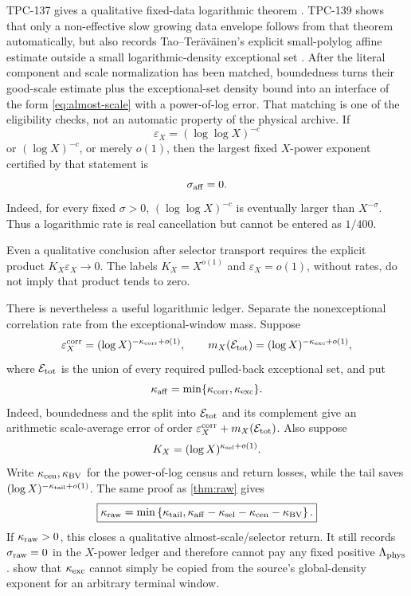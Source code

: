 \documentclass[11pt]{article}
\theoremstyle{definition}
\theoremstyle{remark}
\begin{document}
TPC-137 gives a qualitative fixed-data logarithmic theorem
\citep{WangTPC137}.  TPC-139 shows that only a non-effective slow
growing data envelope follows from that theorem automatically, but
also records Tao--Ter\"av\"ainen's explicit small-polylog affine
estimate outside a small logarithmic-density exceptional set
\citep{WangTPC139,TaoTeravainen2026}.
After the literal component and scale normalization has been
matched, boundedness turns their good-scale estimate plus the
exceptional-set density bound into an interface of the form
\eqref{eq:almost-scale} with a power-of-log error.  That matching is
one of the eligibility checks, not an automatic property of the
physical archive.
If
\[
 \varepsilon_X=(\log\log X)^{-c}
\]
or \((\log X)^{-c}\), or merely \(o(1)\), then the largest fixed
\(X\)-power exponent certified by that statement is
\[
 \sigma_{\rm aff}=0.
\]
Indeed, for every fixed \(\sigma>0\),
\((\log\log X)^{-c}\) is eventually larger than \(X^{-\sigma}\).
Thus a logarithmic rate is real cancellation but cannot be entered
as \(1/400\).

Even a qualitative conclusion after selector transport requires
the explicit product \(K_X\varepsilon_X\to0\).  The labels
\(K_X=X^{o(1)}\) and \(\varepsilon_X=o(1)\), without rates, do not
imply that product tends to zero.

There is nevertheless a useful logarithmic ledger.  Separate the
nonexceptional correlation rate from the exceptional-window mass.
Suppose
\[
 \varepsilon_X^{\rm corr}
 =(\log X)^{-\kappa_{\rm corr}+o(1)},\qquad
 m_X(\mathcal E_{\rm tot})
 =(\log X)^{-\kappa_{\rm exc}+o(1)},
\]
where \(\mathcal E_{\rm tot}\) is the union of every required
pulled-back exceptional set, and put
\begin{equation}
 \kappa_{\rm aff}
 =
 \min\{\kappa_{\rm corr},\kappa_{\rm exc}\}.
\label{eq:effective-log-aff}
\end{equation}
Indeed, boundedness and the split into
\(\mathcal E_{\rm tot}\) and its complement give an arithmetic
scale-average error of order
\(\varepsilon_X^{\rm corr}+m_X(\mathcal E_{\rm tot})\).
Also suppose
\[
 K_X=(\log X)^{\kappa_{\rm sel}+o(1)}.
\]
Write \(\kappa_{\rm cen},\kappa_{\rm BV}\) for the
power-of-log census and return losses, while the tail saves
\((\log X)^{-\kappa_{\rm tail}+o(1)}\).  The same proof as
\cref{thm:raw} gives
\begin{equation}
\boxed{
 \kappa_{\rm raw}
 =
 \min\left\{
 \kappa_{\rm tail},
 \kappa_{\rm aff}-\kappa_{\rm sel}
 -\kappa_{\rm cen}-\kappa_{\rm BV}
 \right\}.}
\label{eq:log-ledger}
\end{equation}
If \(\kappa_{\rm raw}>0\), this closes a qualitative
almost-scale/selector return.  It still records
\(\sigma_{\rm raw}=0\) in the \(X\)-power ledger and therefore
cannot pay any fixed positive \(\Lambda_{\rm phys}\).
 show that
\(\kappa_{\rm exc}\) cannot simply be copied from the source's
global-density exponent for an arbitrary terminal window.
\end{document}
